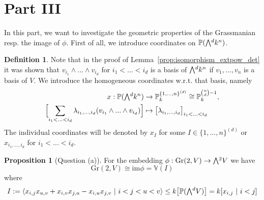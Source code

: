 \documentclass{scrartcl}
\newcommand{\V}{\mathbb{V}}
\newcommand{\Proj}{\mathbb{P}}
\newcommand{\Gr}{\mathrm{Gr}}
\newcommand{\extpow}{\mathchoice{{\textstyle\bigwedge}}
    {{\bigwedge}}
    {{\textstyle\wedge}}
    {{\scriptstyle\wedge}}}
\theoremstyle{definition}
\newtheorem{definition}[subsection]{Definition}
\newtheorem{proposition}[subsection]{Proposition}
\begin{document}
\section{Part III}
In this part, we want to investigate the geometric properties of the Grassmanian resp. the image of $\phi$.
First of all, we introduce coordinates on $\Proj(\extpow^d k^n)$.
\begin{definition}
    Note that in the proof of Lemma~\ref{prop:isomorphism_extpow_det} it was shown that $v_{i_1} \wedge ... \wedge v_{i_d}$ for $i_1 < ... < i_d$ is a basis of $\extpow^d k^n$ if $v_1, ..., v_n$ is a basis of $V$.
    We introduce the homogeneous coordinates w.r.t. that basis, namely
    \begin{align*}
        x: \Proj(\extpow^d k^n) &\to \Proj_k^{\{1, ..., n\}^{(d)}} \cong \Proj_k^{{n \choose d} - 1}, \\
        \Bigl[ \sum_{i_1 < ... < i_d} \lambda_{i_1, ..., i_d} (v_{i_1} \wedge ... \wedge v_{i_d}) \Bigr] &\mapsto \bigl[ \lambda_{i_1, ..., i_d} \bigr]_{i_1 < ... < i_d}
    \end{align*}
    The individual coordinates will be denoted by $x_I$ for some $I \in \{1, ..., n\}^{(d)}$ or $x_{i_1, ..., i_d}$ for $i_1 < ... < i_d$.
\end{definition}
\begin{proposition}[Question (a)]
    \label{prop:equations_grassmanian_2}
    For the embedding $\phi: \Gr(2, V) \to \extpow^2 V$ we have
    \begin{equation*}
        \Gr(2, V) \cong \mathrm{im}\phi = \V(I)
    \end{equation*}
    where
    \begin{equation*}
        I := \langle x_{i, j}x_{u, v} + x_{i, v}x_{j, u} - x_{i, u}x_{j, v} \ | \ i < j < u < v \rangle \leq k\bigl[\Proj(\extpow^d V)\bigr] = k[x_{i, j} \ | \ i < j]
    \end{equation*}
\end{proposition}
\end{document}

